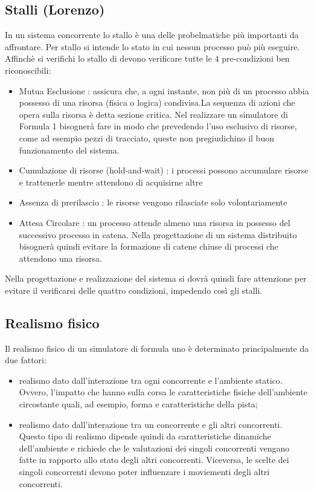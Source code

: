 \subsection{Stalli (Lorenzo)}
\label{stalli}
In un sistema concorrente lo stallo è una delle probelmatiche pi\`{u} importanti
da affrontare. Per stallo si intende lo stato in cui nessun processo pu\`{o}
pi\`{u} eseguire. Affinch\`{e} si verifichi lo stallo di devono verificare tutte
le 4 pre-condizioni ben riconoscibili:
\begin{itemize}
\item {Mutua Esclusione :} assicura che, a ogni instante, non pi\`{u} di un
processo abbia possesso di una risorsa (fisica o logica) condivisa.La sequenza
di azioni che opera sulla risorsa \`{e} detta sezione critica. Nel realizzare un
simulatore di Formula 1 bisogner\`{a} fare in modo che prevedendo l'uso
esclusivo di risorse, come ad esempio pezzi di tracciato, queste non
pregiudichino il buon funzionamento del sistema.
\item{Cumulazione di risorse (hold-and-wait) :} i processi possono accumulare
risorse e trattenerle mentre attendono di acquisirne altre
\item{Assenza di prerilascio :} le risorse vengono rilasciate solo
volontariamente
\item{Attesa Circolare :} un processo attende almeno una risorsa in possesso del
successivo processo in catena. Nella progettazione di un sistema distribuito
bisogner\`{a} quindi evitare la formazione di catene chiuse di processi che
attendono una risorsa.
\end{itemize}
Nella progettazione e realizzazione del sistema si dovr\`{a} quindi fare
attenzione per evitare il verificarsi delle quattro condizioni, impedendo
cos\`{i} gli stalli.
\subsection{Realismo fisico}
Il realismo fisico di un simulatore di formula uno è determinato principalmente
da due fattori:
\begin{itemize}
\item realismo dato dall'interazione tra ogni concorrente e l'ambiente statico.
Ovvero, l'impatto che hanno sulla corsa
le caratteristiche fisiche dell'ambiente circostante quali, ad esempio, forma e
caratteristiche della pista;
\item realismo dato dall'interazione tra un concorrente e gli altri concorrenti.
Questo tipo di realismo 
dipende quindi da caratteristiche dinamiche dell'ambiente e richiede che le
valutazioni dei singoli concorrenti
vengano fatte in rapporto allo stato degli altri concorrenti. Viceversa, le
scelte dei singoli concorrenti
devono poter influenzare i moviementi degli altri concorrenti.
\end{itemize}
